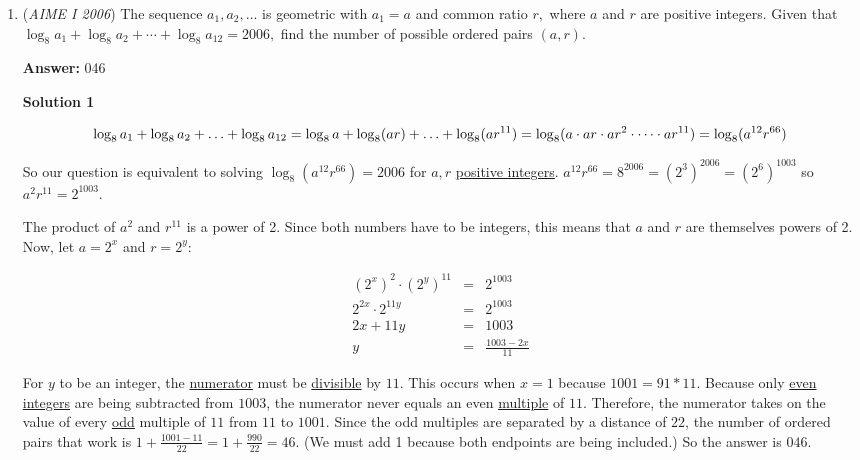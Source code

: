 \begin{enumerate}
	\item (\textit{AIME I 2006}) The sequence $a_1, a_2, \ldots$ is geometric with $a_1=a$ and common ratio $r,$ where $a$ and $r$ are positive integers. Given that $\log_8 a_1+\log_8 a_2+\cdots+\log_8 a_{12} = 2006,$ find the number of possible ordered pairs $(a,r).$

 \textbf{Answer: }046



\textbf{Solution 1}


 \[\log_8 a_1+\log_8 a_2+\ldots+\log_8 a_{12}= \log_8 a+\log_8 (ar)+\ldots+\log_8 (ar^{11}) \\ = \log_8(a\cdot ar\cdot ar^2\cdot \cdots \cdot ar^{11}) = \log_8  (a^{12}r^{66})\]

 So our question is equivalent to solving $\log_8 (a^{12}r^{66})=2006$ for $a, r$ \href{https://artofproblemsolving.com/wiki/index.php?title=Positive\_integer}{positive integers}. $a^{12}r^{66}=8^{2006} = (2^3)^{2006} = (2^6)^{1003}$ so $a^{2}r^{11}=2^{1003}$.

 The product of $a^2$ and $r^{11}$ is a power of 2.  Since both numbers have to be integers, this means that $a$ and $r$ are themselves powers of 2.  Now, let $a=2^x$ and $r=2^y$:

 
 \begin{eqnarray*}(2^x)^2\cdot(2^y)^{11}&=&2^{1003}\\ 2^{2x}\cdot 2^{11y}&=&2^{1003}\\ 2x+11y&=&1003\\ y&=&\frac{1003-2x}{11} \end{eqnarray*}

 For $y$ to be an integer, the \href{https://artofproblemsolving.com/wiki/index.php?title=Numerator}{numerator} must be \href{https://artofproblemsolving.com/wiki/index.php?title=Divisible}{divisible} by $11$.  This occurs when $x=1$ because $1001=91*11$. Because only \href{https://artofproblemsolving.com/wiki/index.php?title=Even\_integer}{even integers} are being subtracted from $1003$, the numerator never equals an even \href{https://artofproblemsolving.com/wiki/index.php?title=Multiple}{multiple} of $11$. Therefore, the numerator takes on the value of every \href{https://artofproblemsolving.com/wiki/index.php?title=Odd\_integer}{ odd} multiple of $11$ from $11$ to $1001$.  Since the odd multiples are separated by a distance of $22$, the number of ordered pairs that work is $1 + \frac{1001-11}{22}=1 + \frac{990}{22}=46$.  (We must add 1 because both endpoints are being included.) So the answer is $\boxed{046}$.


\end{enumerate}
